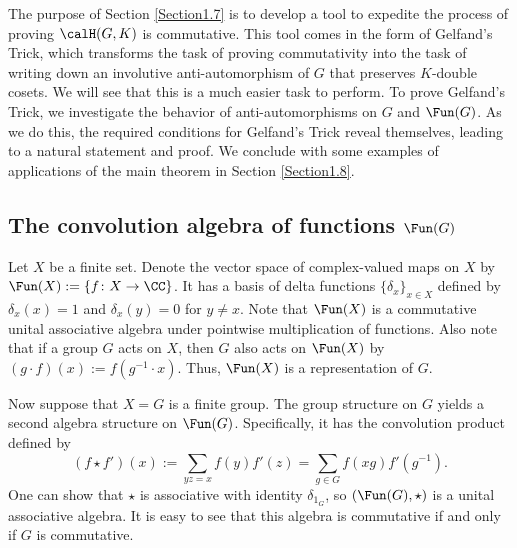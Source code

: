 \documentclass[11pt]{amsart}
\theoremstyle{remark}
\begin{document}
The purpose of Section \ref{Section1.7} is to develop a tool to expedite the process of proving $\calH(G,K)$ is commutative.
This tool comes in the form of Gelfand's Trick, which transforms the task of proving commutativity into the task of writing down an involutive anti-automorphism of $G$ that preserves $K$-double cosets.
We will see that this is a much easier task to perform.
To prove Gelfand's Trick, we investigate the behavior of anti-automorphisms on $G$ and $\Fun(G)$.
As we do this, the required conditions for Gelfand's Trick reveal themselves, leading to a natural statement and proof.
We conclude with some examples of applications of the main theorem in Section \ref{Section1.8}.


\subsection{The convolution algebra of functions $\Fun(G)$}\label{Section1.1}
Let $X$ be a finite set.
Denote the vector space of complex-valued maps on $X$ by $\Fun(X) := \{f\colon X\to \CC\}$.
It has a basis of delta functions $\{\delta_x\}_{x\in X}$ defined by $\delta_x(x)=1$ and $\delta_x(y)=0$ for $y\neq x$.
Note that $\Fun(X)$ is a commutative unital associative algebra under pointwise multiplication of functions.
Also note that if a group $G$ acts on $X$, then $G$ also acts on $\Fun(X)$ by $(g\cdot f)(x) := f(g^{-1}\cdot x)$.
Thus, $\Fun(X)$ is a representation of $G$.

Now suppose that $X=G$ is a finite group.
The group structure on $G$ yields a second algebra structure on $\Fun(G)$.
Specifically, it has the convolution product defined by
\[
	(f\star f')(x) := \sum_{yz = x} f(y)f'(z) = \sum_{g\in G} f(xg)f'(g^{-1}).
\]
One can show that $\star$ is associative with identity $\delta_{1_G}$, so $(\Fun(G),\star)$ is a unital associative algebra.
It is easy to see that this algebra is commutative if and only if $G$ is commutative.

\end{document}
